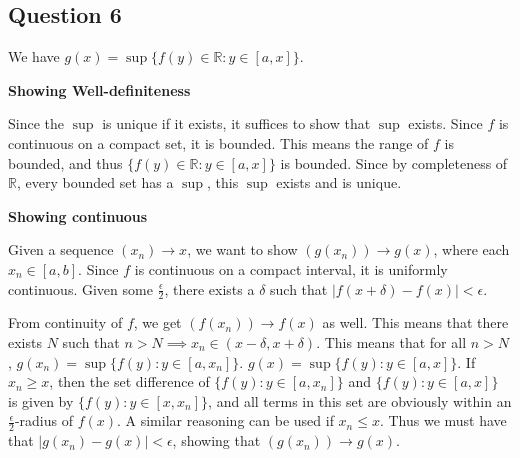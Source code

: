 \documentclass{article}
\begin{document}
\subsection*{Question 6}
We have $g(x)=\sup\{f(y) \in \mathbb{R} : y \in [a,x]\}$.

\textbf{Showing Well-definiteness}

Since the $\sup$ is unique if it exists, it suffices to show that $\sup$ exists. Since $f$ is continuous on a compact set, it is bounded. This means the range of $f$ is bounded, and thus $\{f(y) \in \mathbb{R} : y \in [a,x]\}$ is bounded. Since by completeness of $\mathbb{R}$, every bounded set has a $\sup$, this $\sup$ exists and is unique.

\textbf{Showing continuous}

Given a sequence $(x_n) \to x$, we want to show $(g(x_n)) \to g(x)$, where each $x_n \in [a,b]$. Since $f$ is continuous on a compact interval, it is uniformly continuous. Given some $\frac{\epsilon}{2}$, there exists a $\delta$ such that $|f(x+\delta)-f(x)|<\epsilon$.

From continuity of $f$, we get $(f(x_n)) \to f(x)$ as well. This means that there exists $N$ such that $n>N \implies x_n \in (x - \delta, x+\delta)$. This means that for all $n>N$, $g(x_n)= \sup\{f(y) : y \in [a,x_n]\}$. $g(x)= \sup\{f(y) : y \in [a,x]\}$. If $x_n \geq x$, then the set difference of $\{f(y) : y \in [a,x_n]\}$ and $\{f(y) : y \in [a,x]\}$ is given by $\{f(y) : y \in [x,x_n]\}$, and all terms in this set are obviously within an $\frac{\epsilon}{2}$-radius of $f(x)$. A similar reasoning can be used if $x_n \leq x$. Thus we must have that $|g(x_n)-g(x)|< \epsilon$, showing that $(g(x_n)) \to g(x)$.
\end{document}
